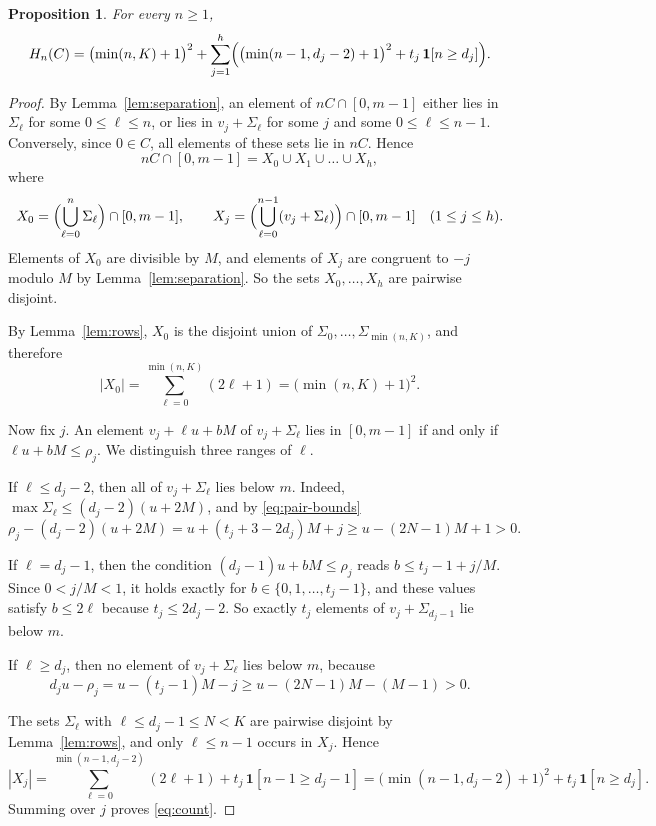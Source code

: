 \documentclass[11pt]{amsart}
\newtheorem{proposition}[theorem]{Proposition}
\theoremstyle{definition}
\theoremstyle{remark}
\numberwithin{equation}{section}
\newcommand{\ind}[1]{\mathbf{1}[#1]}
\begin{document}
\begin{proposition}\label{prop:count}
For every $n\ge 1$,
\begin{equation}\label{eq:count}
H_n(C)=\bigl(\min(n,K)+1\bigr)^2+\sum_{j=1}^{h}\Bigl(\bigl(\min(n-1,d_j-2)+1\bigr)^2+t_j\,\ind{n\ge d_j}\Bigr).
\end{equation}
\end{proposition}

\begin{proof}
By Lemma~\ref{lem:separation}, an element of $nC\cap[0,m-1]$ either lies in $\Sigma_\ell$ for some $0\le\ell\le n$, or lies in $v_j+\Sigma_\ell$ for some $j$ and some $0\le\ell\le n-1$. Conversely, since $0\in C$, all elements of these sets lie in $nC$. Hence
\[
nC\cap[0,m-1]=X_0\cup X_1\cup\dots\cup X_h,
\]
where
\[
X_0=\Bigl(\bigcup_{\ell=0}^{n}\Sigma_\ell\Bigr)\cap[0,m-1],\qquad X_j=\Bigl(\bigcup_{\ell=0}^{n-1}(v_j+\Sigma_\ell)\Bigr)\cap[0,m-1]\quad(1\le j\le h).
\]
Elements of $X_0$ are divisible by $M$, and elements of $X_j$ are congruent to $-j$ modulo $M$ by Lemma~\ref{lem:separation}. So the sets $X_0,\dots,X_h$ are pairwise disjoint.

By Lemma~\ref{lem:rows}, $X_0$ is the disjoint union of $\Sigma_0,\dots,\Sigma_{\min(n,K)}$, and therefore
\[
|X_0|=\sum_{\ell=0}^{\min(n,K)}(2\ell+1)=\bigl(\min(n,K)+1\bigr)^2.
\]

Now fix $j$. An element $v_j+\ell u+bM$ of $v_j+\Sigma_\ell$ lies in $[0,m-1]$ if and only if $\ell u+bM\le\rho_j$. We distinguish three ranges of $\ell$.

If $\ell\le d_j-2$, then all of $v_j+\Sigma_\ell$ lies below $m$. Indeed, $\max\Sigma_\ell\le(d_j-2)(u+2M)$, and by \eqref{eq:pair-bounds}
\[
\rho_j-(d_j-2)(u+2M)=u+(t_j+3-2d_j)M+j\ge u-(2N-1)M+1>0.
\]

If $\ell=d_j-1$, then the condition $(d_j-1)u+bM\le\rho_j$ reads $b\le t_j-1+j/M$. Since $0<j/M<1$, it holds exactly for $b\in\{0,1,\dots,t_j-1\}$, and these values satisfy $b\le 2\ell$ because $t_j\le 2d_j-2$. So exactly $t_j$ elements of $v_j+\Sigma_{d_j-1}$ lie below $m$.

If $\ell\ge d_j$, then no element of $v_j+\Sigma_\ell$ lies below $m$, because
\[
d_ju-\rho_j=u-(t_j-1)M-j\ge u-(2N-1)M-(M-1)>0.
\]

The sets $\Sigma_\ell$ with $\ell\le d_j-1\le N<K$ are pairwise disjoint by Lemma~\ref{lem:rows}, and only $\ell\le n-1$ occurs in $X_j$. Hence
\[
|X_j|=\sum_{\ell=0}^{\min(n-1,d_j-2)}(2\ell+1)+t_j\,\ind{n-1\ge d_j-1}=\bigl(\min(n-1,d_j-2)+1\bigr)^2+t_j\,\ind{n\ge d_j}.
\]
Summing over $j$ proves \eqref{eq:count}.
\end{proof}
\end{document}
